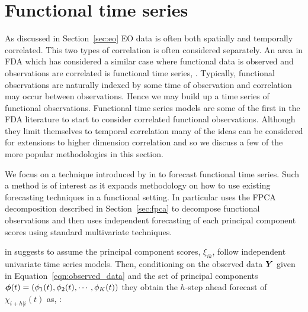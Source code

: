 \section{Functional time series\label{sec:fts}}
As discussed in Section~\ref{sec:eo} EO data is often both spatially and temporally correlated.
This two types of correlation is often considered separately. 
An area in FDA which has considered a similar case where functional data is observed and observations are correlated is functional time series, \citep{aguilera_forecasting_1999}. Typically, functional observations are naturally indexed by some time of observation and correlation may occur between observations.
Hence we may build up a time series of functional observations.
Functional time series models are some of the first in the FDA literature to start to consider correlated functional observations.
Although they limit themselves to temporal correlation many of the ideas can be considered for extensions to higher dimension correlation and so we discuss a few of the more popular methodologies in this section.

We focus on a technique introduced by \citeauthor{hyndman_forecasting_2009} in \citep{hyndman_forecasting_2009} to forecast functional time series.
Such a method is of interest as it expands methodology on how to use existing forecasting techniques in a functional setting.
In particular \citep{hyndman_forecasting_2009} uses the FPCA decomposition described in Section~\ref{sec:fpca} to decompose functional observations and then uses independent forecasting of each principal component scores using standard multivariate techniques.

\citeauthor{hyndman_robust_2007} in \citep{hyndman_robust_2007} suggests to assume the principal component scores, $\xi_{ik}$, follow independent univariate time series models.
Then, conditioning on the observed data $\bm{{Y}}$ given in Equation~\eqref{eqn:observed_data} and the set of principal components $\bm{{\phi}}(t) = \left(\phi_1(t), \phi_2(t), \cdots, \phi_K(t)\right)$ they obtain the $h$-step ahead forecast of $\chi_{i+h | i}(t)$ as, \citep{hyndman_robust_2007}:

